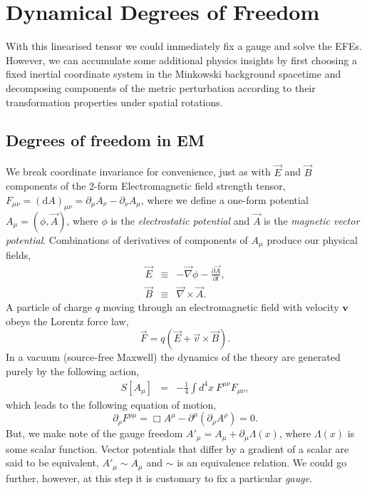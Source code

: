 \section{Dynamical Degrees of Freedom}
With this linearised tensor we could immediately fix a gauge and solve the EFEs. However, we can accumulate some additional physics insights by first choosing a fixed inertial coordinate system in the Minkowski background spacetime and decomposing components of the metric perturbation according to their transformation properties under spatial rotations.

\subsection{Degrees of freedom in EM}
We break coordinate invariance for convenience, just as with $\vec{E}$ and $\vec{B}$ components of the 2-form Electromagnetic field strength tensor, $F_{\mu\nu} =(\text{d}A)_{\mu\nu} =\partial_{\mu} A_{\nu} - \partial_{\nu} A_{\mu}$, where we define a one-form potential $A_{\mu} = \left(\phi, \vec{A}\right)$, where $\phi$ is the \textit{electrostatic potential} and $\vec{A}$ is the \textit{magnetic vector potential}. Combinations of derivatives of components of $A_{\mu}$ produce our physical fields, 
\begin{eqnarray}\label{EandMFields}
    \vec{E} &\equiv& -\vec{\nabla}\phi - \frac{\partial \vec{A}}{\partial t}, \\
    \vec{B} &\equiv& \vec{\nabla}\times\vec{A}.
\end{eqnarray}
A particle of charge $q$ moving through an electromagnetic field with velocity $\mathbf{v}$ obeys the Lorentz force law,
\begin{equation}\label{lorentz-force-law}
    \vec{F} = q\left(\vec{E}+ \vec{v}\times\vec{B}\right).
\end{equation}
In a vacuum (source-free Maxwell) the dynamics of the theory are generated purely by the following action, 
\begin{eqnarray}
    S[A_{\mu}] &=& -\frac{1}{4}\int d^4 x \ F^{\mu\nu}F_{\mu\nu},
\end{eqnarray}
which leads to the following equation of motion,
\begin{equation}\label{em-eom}
\partial_{\rho}F^{\rho\mu} = \Box A^{\mu} - \partial^{\mu}(\partial_{\rho}A^{\rho}) = 0.
\end{equation}
But, we make note of the gauge freedom $A'_{\mu} = A_{\mu} + \partial_{\mu}\Lambda(x)$, where $\Lambda(x)$ is some scalar function. Vector potentials that differ by a gradient of a scalar are said to be equivalent, $A'_{\mu}\sim{A_{\mu}}$ and $\sim{}$ is an equivalence relation. We could go further, however, at this step it is customary to fix a particular \textit{gauge}. 
